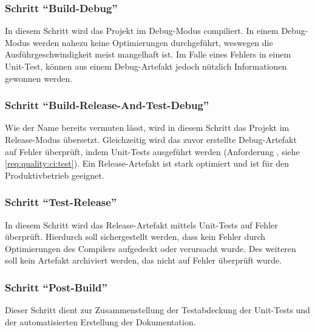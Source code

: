 \subsubsection{Schritt \enquote{Build-Debug}}
In diesem Schritt wird das Projekt im Debug-Modus compiliert.
In einem Debug-Modus werden nahezu keine Optimierungen durchgeführt, weswegen die Ausführgeschwindigkeit meist mangelhaft ist.
Im Falle eines Fehlers in einem Unit-Test, können aus einem Debug-Artefakt jedoch nützlich Informationen gewonnen werden.

\subsubsection{Schritt \enquote{Build-Release-And-Test-Debug}}
Wie der Name bereits vermuten lässt, wird in diesem Schritt das Projekt im Release-Modus übersetzt.
Gleichzeitig wird das zuvor erstellte Debug-Artefakt auf Fehler überprüft, indem Unit-Tests ausgeführt werden (Anforderung , siehe \autoref{req:quality:ci:test}).
Ein Release-Artefakt ist stark optimiert und ist für den Produktivbetrieb geeignet.

\subsubsection{Schritt \enquote{Test-Release}}

In diesem Schritt wird das Release-Artefakt mittels Unit-Tests auf Fehler überprüft.
Hierdurch soll sichergestellt werden, dass kein Fehler durch Optimierungen des Compilers aufgedeckt oder verursacht wurde.
Des weiteren soll kein Artefakt archiviert werden, das nicht auf Fehler überprüft wurde.

\subsubsection{Schritt \enquote{Post-Build}}
Dieser Schritt dient zur Zusammenstellung der Testabdeckung der Unit-Tests und der automatisierten  Erstellung der Dokumentation.

